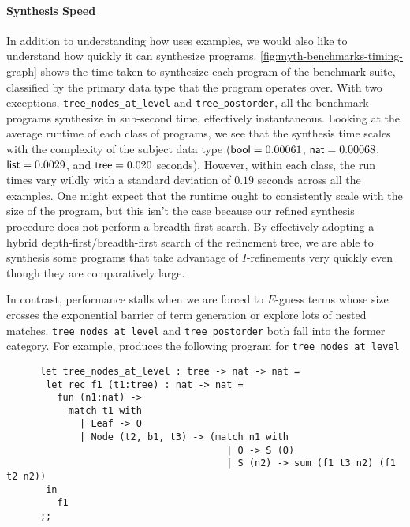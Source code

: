 \paragraph{Synthesis Speed}



In addition to understanding how \myth{} uses examples, we would also like to understand how quickly it can synthesize programs.
\autoref{fig:myth-benchmarks-timing-graph} shows the time taken to synthesize each program of the benchmark suite, classified by the primary data type that the program operates over.
With two exceptions, \texttt{tree\_nodes\_at\_level} and \texttt{tree\_postorder}, all the benchmark programs synthesize in sub-second time, effectively instantaneous.
Looking at the average runtime of each class of programs, we see that the synthesis time scales with the complexity of the subject data type ($\mathsf{bool} = 0.00061$, $\mathsf{nat} = 0.00068$, $\mathsf{list} = 0.0029$, and $\mathsf{tree} = 0.020$ seconds).
However, within each class, the run times vary wildly with a standard deviation of $0.19$ seconds across all the examples.
One might expect that the runtime ought to consistently scale with the size of the program, but this isn't the case because our refined synthesis procedure does not perform a breadth-first search.
By effectively adopting a hybrid depth-first/breadth-first search of the refinement tree, we are able to synthesis some programs that take advantage of $I$-refinements very quickly even though they are comparatively large.

In contrast, performance stalls when we are forced to $E$-guess terms whose size crosses the exponential barrier of term generation or explore lots of nested matches.
\texttt{tree\_nodes\_at\_level} and \texttt{tree\_postorder} both fall into the former category.
For example, \myth{} produces the following program for \texttt{tree\_nodes\_at\_level}

\begin{center}
  \begin{minipage}{\textwidth}
    \begin{lstlisting}
      let tree_nodes_at_level : tree -> nat -> nat =
       let rec f1 (t1:tree) : nat -> nat =
         fun (n1:nat) ->
           match t1 with
             | Leaf -> O
             | Node (t2, b1, t3) -> (match n1 with
                                       | O -> S (O)
                                       | S (n2) -> sum (f1 t3 n2) (f1 t2 n2))
       in
         f1
      ;;
    \end{lstlisting}
  \end{minipage}
\end{center}

